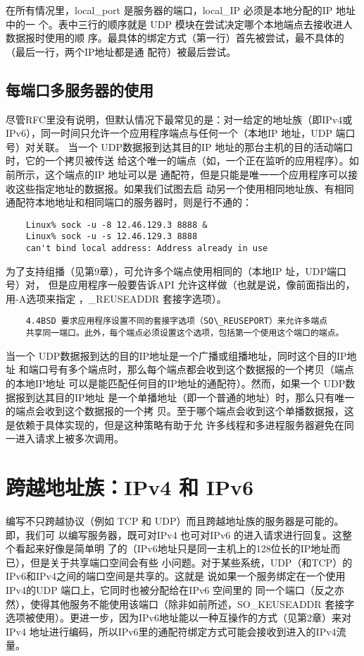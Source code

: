 在所有情况里，local\_port 是服务器的端口，local\_IP 必须是本地分配的IP 地址中的一
个。表中三行的顺序就是 UDP 模块在尝试决定哪个本地端点去接收进人数据报时使用的顺
序。最具体的绑定方式（第一行）首先被尝试，最不具体的（最后一行，两个IP地址都是通
配符）被最后尝试。

\subsection{每端口多服务器的使用}
尽管RFC里没有说明，但默认情况下最常见的是：对一给定的地址族（即IPv4或
IPv6），同一时间只允许一个应用程序端点与任何一个（本地IP 地址，UDP 端口号）对关联。
当一个 UDP数据报到达其目的IP 地址的那台主机的目的活动端口时，它的一个拷贝被传送
给这个唯一的端点（如，一个正在监听的应用程序）。如前所示，这个端点的IP 地址可以是
通配符，但是只能是唯一一个应用程序可以接收这些指定地址的数据报。如果我们试图去启
动另一个使用相同地址族、有相同通配符本地地址和相同端口的服务器时，则是行不通的：

\begin{verbatim}
    Linux% sock -u -8 12.46.129.3 8888 &
    Linux% sock -u -s 12.46.129.3 8888
    can't bind local address: Address already in use
\end{verbatim}

为了支持组播（见第9章），可允许多个端点使用相同的（本地IP 址，UDP端口号）对，
但是应用程序一般要告诉API 允许这样做（也就是说，像前面指出的，用-A选项来指定
，\_REUSEADDR 套接字选项）。

\begin{verbatim}
    4.4BSD 要求应用程序设置不同的套接字选项（SO\_REUSEPORT）来允许多端点
    共享同一端口。此外，每个端点必须设置这个选项，包括第一个使用这个端口的端点。
\end{verbatim}

当一个 UDP数据报到达的目的IP地址是一个广播或组播地址，同时这个目的IP地址
和端口号有多个端点时，那么每个端点都会收到这个数据报的一个拷贝（端点的本地IP地址
可以是能匹配任何目的IP地址的通配符）。然而，如果一个 UDP数据报到达其目的IP地址
是一个单播地址（即一个普通的地址）时，那么只有唯一的端点会收到这个数据报的一个拷
贝。至于哪个端点会收到这个单播数据报，这是依赖于具体实现的，但是这种策略有助于允
许多线程和多进程服务器避免在同一进入请求上被多次调用。

\section{跨越地址族：IPv4 和 IPv6}

编写不只跨越协议（例如 TCP 和 UDP）而且跨越地址族的服务器是可能的。即，我们可
以编写服务器，既可对IPv4 也可对IPv6 的进入请求进行回复。这整个看起来好像是简单明
了的（IPv6地址只是同一主机上的128位长的IP地址而已），但是关于共享端口空间会有些
小问题。对于某些系统，UDP（和TCP）的IPv6和IPv4之间的端口空间是共享的。这就是
说如果一个服务绑定在一个使用IPv4的UDP 端口上，它同时也被分配给在IPv6 空间里的
同一个端口（反之亦然），使得其他服务不能使用该端口（除非如前所述，SO\_KEUSEADDR
套接字选项被使用）。更进一步，因为IPv6地址能以一种互操作的方式（见第2章）来对
IPv4 地址进行编码，所以IPv6里的通配符绑定方式可能会接收到进入的IPv4流量。

